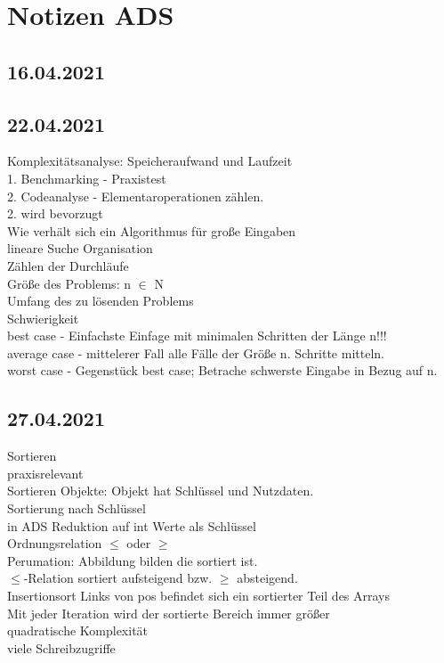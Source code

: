 \documentclass{article}
\begin{document}
	\section*{Notizen ADS}
	\subsection*{16.04.2021}
	\subsection*{22.04.2021}
	Komplexitätsanalyse: Speicheraufwand und Laufzeit \\
	1. Benchmarking - Praxistest \\
	2. Codeanalyse - Elementaroperationen zählen. \\
	2. wird bevorzugt \\
	Wie verhält sich ein Algorithmus für große Eingaben \\
	lineare Suche
	Organisation
	\\
	Zählen der Durchläufe \\
	Größe des Problems: n $\in$ N \\
	Umfang des zu lösenden Problems \\
	Schwierigkeit \\
	best case - Einfachste Einfage mit minimalen Schritten der Länge n!!! \\
	average case - mittelerer Fall alle Fälle der Größe n. Schritte mitteln. \\
	worst case - Gegenstück best case; Betrache schwerste Eingabe in Bezug auf n. \\
	\subsection*{27.04.2021}
	Sortieren \\
	praxisrelevant \\
	Sortieren Objekte: Objekt hat Schlüssel und Nutzdaten. \\
	Sortierung nach Schlüssel \\
	in ADS Reduktion auf int Werte als Schlüssel \\
	Ordnungsrelation $\leq$ oder $\geq$ \\
	Perumation: Abbildung bilden die sortiert ist. \\
	$\leq$-Relation sortiert aufsteigend bzw. $\geq$ absteigend. \\
	Insertionsort Links von pos befindet sich ein sortierter Teil des Arrays \\
	Mit jeder Iteration wird der sortierte Bereich immer größer \\
	quadratische Komplexität \\
	viele Schreibzugriffe \\
\end{document}
